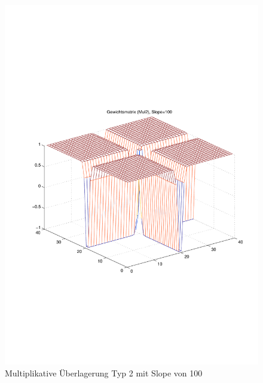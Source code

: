 \begin{figure}[hbt]
	\centering
	\includegraphics[width=0.6\linewidth]{./Bilder/Auswertung/Gewichtsmatrix/Gewichtsmatrix_Mul2_Slope_100}
	\caption{Multiplikative Überlagerung Typ 2 mit Slope von 100}
	\label{Mul2100}
\end{figure}


\newpage
